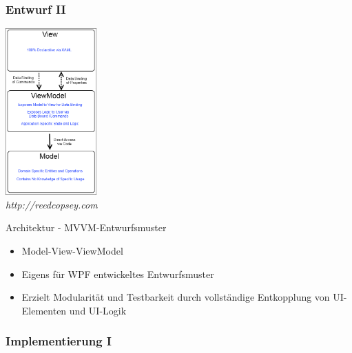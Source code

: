 \documentclass[t]{beamer}
\begin{document}
\begin{frame}
	\frametitle{Entwurf II}
	\noindent
	\begin{minipage}{3.5cm}
	    \includegraphics[width=3.5cm]{MVVM_thumb.png} ~\\
	    \textit{http://reedcopsey.com}
	\end{minipage}
	\hfill
	\begin{minipage}{8cm}
		Architektur - MVVM-Entwurfsmuster ~\\
	    \begin{itemize}	    
	    	\item<+-> Model-View-ViewModel
	        \item<+-> Eigens für WPF entwickeltes Entwurfsmuster
	        \item<+-> Erzielt Modularität und Testbarkeit durch vollständige Entkopplung von UI-Elementen und UI-Logik
	    \end{itemize}
	\end{minipage}
\end{frame}

\begin{frame}
	\frametitle{Implementierung I}

		
	
\end{frame}
\end{document}
